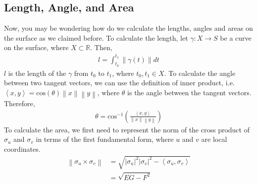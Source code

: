 \documentclass{article}
\theoremstyle{plain}
\theoremstyle{definition}
\theoremstyle{remark}
\newcommand{\R}{\mathbb{R}}
\begin{document}
\subsection{Length, Angle, and Area}
Now, you may be wondering how do we calculate the lengths, angles and areas on the surface as we claimed before. To calculate the length, let \( \gamma: X \rightarrow S \) be a curve on the surface, where \(X \subset \R \). Then,
\begin{align*}
    l = \int_{t_0}^{t_1} \left\lVert \gamma(t)\right\rVert dt
\end{align*}
\(l\) is the length of the \(\gamma\) from \(t_0\) to \(t_1\), where \( t_0, t_1 \in X\).
To calculate the angle between two tangent vectors, we can use the definition of inner product, i.e. \( \left\langle x, y\right\rangle = \text{cos}(\theta) \left\lVert x \right\rVert \left\lVert y \right\rVert  \), where \(\theta\) is the angle between the tangent vectors. Therefore,
\begin{align*}
    \theta = \text{cos}^{-1} \left(  \frac{\left\langle x, y\right\rangle }{\left\lVert x \right\rVert \left\lVert y \right\rVert } \right)
\end{align*}
To calculate the area, we first need to represent the norm of the cross product of \( \sigma_u \) and \( \sigma_v \) in terms of the first fundamental form, where \( u \) and \( v\) are local coordinates.
\begin{align*}
    \left\lVert \sigma_u \times \sigma_v \right\rVert & = \sqrt{\left\lvert \sigma_u\right\rvert^2 \left\lvert \sigma_v \right\rvert^2 - \left\langle \sigma_u, \sigma_v \right\rangle } \\
                                                      & = \sqrt{EG - F^2}
\end{align*}
\end{document}
